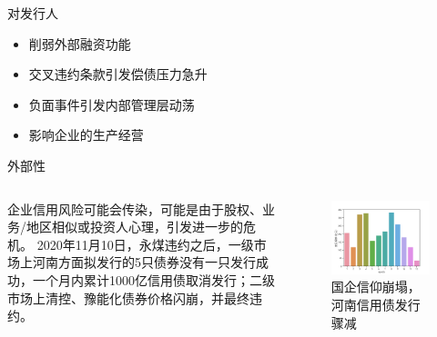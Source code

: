 \begin{frame}{对发行人}
	\begin{itemize}
		\item 削弱外部融资功能
		\item 交叉违约条款引发偿债压力急升
		\item 负面事件引发内部管理层动荡
		\item 影响企业的生产经营
	\end{itemize}
\end{frame}
\begin{frame}{外部性}
	\begin{columns}[c]
		企业信用风险可能会传染，可能是由于股权、业务/地区相似或投资人心理，引发进一步的危机。\newline
		2020年11月10日，永煤违约之后，一级市场上河南方面拟发行的5只债券没有一只发行成功，一个月内累计1000亿信用债取消发行；二级市场上清控、豫能化债券价格闪崩，并最终违约。
		\begin{figure}
			\centering
			\includegraphics[width=\linewidth]{lib/henan.png}
			\caption{国企信仰崩塌，河南信用债发行骤减}
		\end{figure}
	\end{columns}
\end{frame}
